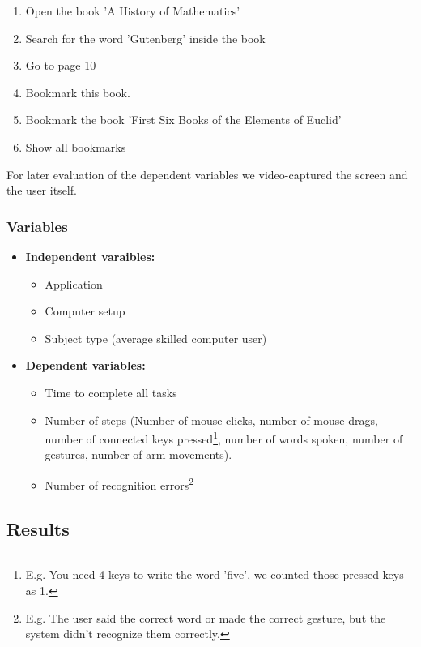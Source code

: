 \documentclass[a4paper, 10pt]{article}
\begin{document}
	\begin{enumerate}
		\item Open the book 'A History of Mathematics'
		\item Search for the word 'Gutenberg' inside the book
		\item Go to page 10
		\item Bookmark this book.
		\item Bookmark the book 'First Six Books of the Elements of Euclid'
		\item Show all bookmarks
	\end{enumerate}
	
	\par{For later evaluation of the dependent variables we video-captured the screen and the user itself.}
	
	\subsubsection{Variables}
	
	\begin{itemize}
		\item \textbf{Independent varaibles:}
		\begin{itemize}
			\item Application
			\item Computer setup
			\item Subject type (average skilled computer user)
		\end{itemize}
		\item \textbf{Dependent variables:}
		\begin{itemize}
			\item Time to complete all tasks
			\item Number of steps (Number of mouse-clicks, number of mouse-drags, number of connected keys pressed\footnote{E.g. You need 4 keys to write the word 'five', we counted those pressed keys as 1.}, number of words spoken, number of gestures, number of arm movements).
			\item Number of recognition errors\footnote{E.g. The user said the correct word or made the correct gesture, but the system didn't recognize them correctly.}
	\end{itemize}
	\end{itemize}		
	
	\subsection{Results}
	
\end{document}
